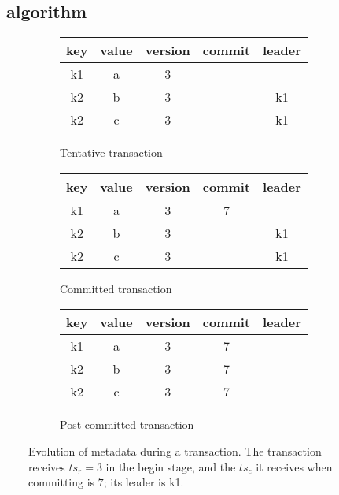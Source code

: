 	\subsection{\sys\ algorithm} 
\label{ssec:ll}

\begin{figure}[!t]
  \centering
  
  \begin{subfigure}[t]{\columnwidth}
      \centering
    \begin{tabular}{|c|c|c|c|c|}
      \hline
      key & value & version & commit& leader\\
      \hline
      k1 & a & 3 & &\\
      k2 & b & 3 & &k1\\
      k2 & c & 3 & &k1\\
      \hline
    \end{tabular}
	\caption[]{Tentative transaction}
    \label{fig:model:tentative}
  \end{subfigure}
  
  \begin{subfigure}[t]{\columnwidth}
    \centering
    \begin{tabular}{|c|c|c|c|c|}
      \hline
      key & value & version & commit& leader\\
      \hline
      k1 & a & 3 & 7&\\
      k2 & b & 3 & &k1\\
      k2 & c & 3 & &k1\\
      \hline
    \end{tabular}
	\caption[]{Committed transaction}
    \label{fig:model:committed}
  \end{subfigure}


  \begin{subfigure}[t]{\columnwidth}
    \centering
    \begin{tabular}{|c|c|c|c|c|}
      \hline
      key & value & version & commit& leader\\
      \hline
      k1 & a & 3 & 7&\\
      k2 & b & 3 & 7&\\
      k2 & c & 3 & 7&\\
      \hline
    \end{tabular}
	\caption[]{Post-committed transaction}
    \label{fig:model:postcommit}
  \end{subfigure}

  
  \caption{Evolution of metadata during a transaction. The transaction receives $ts_r=3$ in the begin stage, 
  and the $ts_c$ it receives when committing is $7$; its leader is k1.}
  \label{fig:model}
\end{figure}


